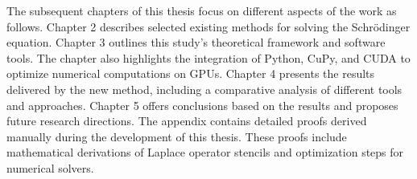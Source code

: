 The subsequent chapters of this thesis focus on different aspects of the work as follows. Chapter 2 describes selected existing methods for solving the Schrödinger equation. Chapter 3 outlines this study's theoretical framework and software tools. The chapter also highlights the integration of Python, CuPy, and CUDA to optimize numerical computations on GPUs. Chapter 4 presents the results delivered by the new method, including a comparative analysis of different tools and approaches. Chapter 5 offers conclusions based on the results and proposes future research directions. The appendix contains detailed proofs derived manually during the development of this thesis. These proofs include mathematical derivations of Laplace operator stencils and optimization steps for numerical solvers.
